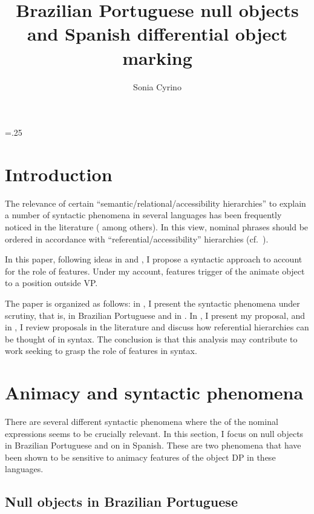 \documentclass[output=paper]{langsci/langscibook}
\author{Sonia Cyrino\affiliation{University of Campinas}}
\title{Brazilian Portuguese null objects and Spanish differential object marking}
\begin{document}
\glsresetall
\maketitle
\multicolsep=.25\baselineskip

\section{Introduction}

The relevance of certain ``semantic/relational/accessibility hierarchies'' to
explain a number of syntactic phenomena in several languages has been
frequently noticed in the literature (\citealt{Silverstein1976,Aissen2003}
among others). In this view, nominal phrases should be ordered in accordance with
``referential/accessibility'' hierarchies (cf.\ \citealt{Aissen2003}).

In this paper, following ideas in \citet{Carnie2005} and \citet{Merchant2006},
I propose a syntactic approach to account for the role of 
features.  Under my account,  features trigger  of
the animate object to a position outside VP.

The paper is organized as follows: in , I present the
syntactic phenomena under scrutiny, that is,  in Brazilian
Portuguese and  in . In
, I present my proposal, and in , I
review proposals in the literature and discuss how referential hierarchies can
be thought of in syntax.  The conclusion is that this analysis may contribute
to work seeking to grasp the role of  features in syntax.

\section{Animacy and syntactic phenomena}\label{sec:27.2}

There are several different syntactic phenomena where the  of the
nominal expressions seems to be crucially relevant. In this section, I focus on
null objects in Brazilian Portuguese and on  in
Spanish. These are two phenomena that have been shown to be sensitive to
animacy features of the object DP in these languages.

\subsection{Null objects in Brazilian Portuguese}\label{sec:27.2.1}
\end{document}
